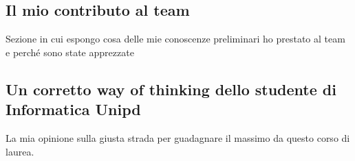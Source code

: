 \subsection{Il mio contributo al team}
Sezione in cui espongo cosa delle mie conoscenze preliminari ho prestato al team e perché sono state apprezzate
\subsection{Un corretto way of thinking dello studente di Informatica Unipd}
La mia opinione sulla giusta strada per guadagnare il massimo da questo corso di laurea.